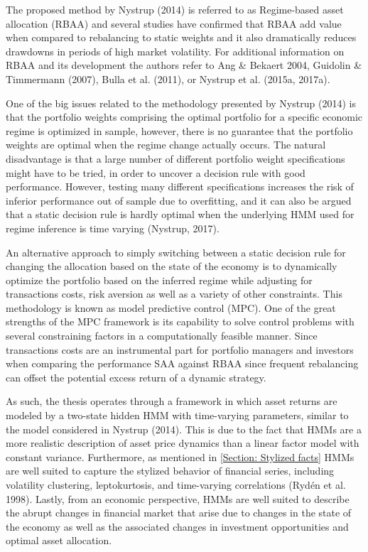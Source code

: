 The proposed method by Nystrup (2014) is referred to as Regime-based asset allocation (RBAA) and several studies have confirmed that RBAA add value when compared to rebalancing to static weights and it also dramatically reduces drawdowns in periods of high market volatility. For additional information on RBAA and its development the authors refer to Ang \& Bekaert 2004, Guidolin \& Timmermann (2007), Bulla et al. (2011), or Nystrup et al. (2015a, 2017a). 

One of the big issues related to the methodology presented by Nystrup (2014) is that the portfolio weights comprising the optimal portfolio for a specific economic regime is optimized in sample, however, there is no guarantee that the portfolio weights are optimal when the regime change actually occurs. The natural disadvantage is that a large number of different portfolio weight specifications might have to be tried, in order to uncover a decision rule with good performance. However, testing many different specifications increases the risk of inferior performance out of sample due to overfitting, and  it can also be argued that a static decision rule is hardly optimal when the underlying HMM  used for regime inference is time varying (Nystrup, 2017).

An alternative approach to simply switching between a static decision rule for changing the allocation based on the state of the economy is to dynamically optimize the portfolio based on the inferred regime while adjusting for transactions costs, risk aversion as well as a variety of other constraints. This methodology is known as model predictive control (MPC). One of the great strengths of the MPC framework is its capability to solve control problems with several constraining factors in a computationally feasible manner. Since transactions costs are an instrumental part for portfolio managers and investors when comparing the performance SAA against RBAA since frequent rebalancing can offset the potential excess return of a dynamic strategy. 

As such, the thesis operates through a framework in which asset returns are modeled by a two-state hidden HMM with time-varying parameters, similar to the model considered in Nystrup (2014). This is due to the fact that HMMs are a more realistic description of asset price dynamics than a linear factor model with constant variance. Furthermore, as mentioned in \ref{Section: Stylized facts} HMMs are well suited to capture the stylized behavior of financial series, including volatility clustering, leptokurtosis, and time-varying correlations (Rydén et al. 1998). Lastly, from an economic perspective, HMMs are well suited to describe the abrupt changes in financial market that arise due to changes in the state of the economy as well as the associated changes in investment opportunities and optimal asset allocation.   

